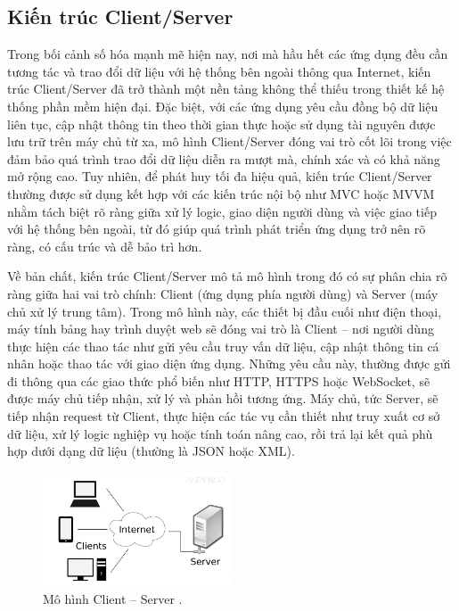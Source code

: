 \subsection{Kiến trúc Client/Server}
\renewcommand{\labelitemi}{--}    
    
        Trong bối cảnh số hóa mạnh mẽ hiện nay, nơi mà hầu hết các ứng dụng đều cần tương tác và trao đổi dữ liệu với hệ thống bên ngoài thông qua Internet, kiến trúc Client/Server đã trở thành một nền tảng không thể thiếu trong thiết kế hệ thống phần mềm hiện đại. Đặc biệt, với các ứng dụng yêu cầu đồng bộ dữ liệu liên tục, cập nhật thông tin theo thời gian thực hoặc sử dụng tài nguyên được lưu trữ trên máy chủ từ xa, mô hình Client/Server đóng vai trò cốt lõi trong việc đảm bảo quá trình trao đổi dữ liệu diễn ra mượt mà, chính xác và có khả năng mở rộng cao. Tuy nhiên, để phát huy tối đa hiệu quả, kiến trúc Client/Server thường được sử dụng kết hợp với các kiến trúc nội bộ như MVC hoặc MVVM nhằm tách biệt rõ ràng giữa xử lý logic, giao diện người dùng và việc giao tiếp với hệ thống bên ngoài, từ đó giúp quá trình phát triển ứng dụng trở nên rõ ràng, có cấu trúc và dễ bảo trì hơn.
    \vspace{0.5em}

    
      Về bản chất, kiến trúc Client/Server mô tả mô hình trong đó có sự phân chia rõ ràng giữa hai vai trò chính: Client (ứng dụng phía người dùng) và Server (máy chủ xử lý trung tâm). Trong mô hình này, các thiết bị đầu cuối như điện thoại, máy tính bảng hay trình duyệt web sẽ đóng vai trò là Client – nơi người dùng thực hiện các thao tác như gửi yêu cầu truy vấn dữ liệu, cập nhật thông tin cá nhân hoặc thao tác với giao diện ứng dụng. Những yêu cầu này, thường được gửi đi thông qua các giao thức phổ biến như HTTP, HTTPS hoặc WebSocket, sẽ được máy chủ tiếp nhận, xử lý và phản hồi tương ứng. Máy chủ, tức Server, sẽ tiếp nhận request từ Client, thực hiện các tác vụ cần thiết như truy xuất cơ sở dữ liệu, xử lý logic nghiệp vụ hoặc tính toán nâng cao, rồi trả lại kết quả phù hợp dưới dạng dữ liệu (thường là JSON hoặc XML).
    \vspace{0.5em}

\begin{figure}[H]
  \centering
  \includegraphics[width=0.5\textwidth]{images/client-server.jpg}
  \caption{Mô hình Client – Server \cite{codelearnClientServer}.}
  \label{fig:fig17}
\end{figure}

